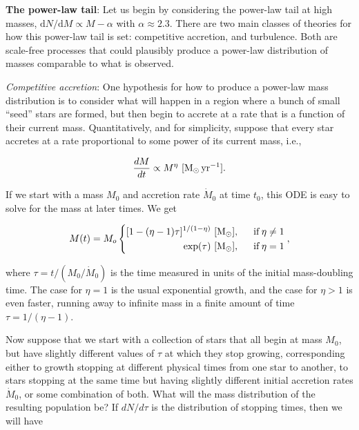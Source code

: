 \documentclass[a4paper,10pt]{article}
\begin{document}
{\noindent}\textbf{The power-law tail}: Let us begin by considering the power-law tail at high masses, $\mathrm{d}N/\mathrm{d}M\propto M-\alpha$ with $\alpha\approx2.3$. There are two main classes of theories for how this power-law tail is set: competitive accretion, and turbulence. Both are scale-free processes that could plausibly produce a power-law distribution of masses comparable to what is observed.

{\noindent}\textit{Competitive accretion}: One hypothesis for how to produce a power-law mass distribution is to consider what will happen in a region where a bunch of small ``seed'' stars are formed, but then begin to accrete at a rate that is a function of their current mass. Quantitatively, and for simplicity, suppose that every star accretes at a rate proportional to some power of its current mass, i.e.,

\begin{align*}
    \frac{dM}{dt} \propto M^\eta ~ [{\rm M_\odot\,yr^{-1}}].
\end{align*}

{\noindent}If we start with a mass $M_0$ and accretion rate $\dot{M}_0$ at time $t_0$, this ODE is easy to solve for the mass at later times. We get

\begin{equation*}
M(t) = M_o
\left\{
\begin{aligned}
[1-(\eta-1)\tau]^{1/(1-\eta)} ~ [{\rm M_\odot}], ~~~~~& \mathrm{if}\,\eta\neq1 \\
\exp(\tau) ~ [{\rm M_\odot}], ~~~~~& \mathrm{if}\,\eta=1
\end{aligned}
\right.
,
\end{equation*}

{\noindent}where $\tau=t/(M_0/\dot{M}_0)$ is the time measured in units of the initial mass-doubling time. The case for $\eta=1$ is the usual exponential growth, and the case for $\eta>1$ is even faster, running away to infinite mass in a finite amount of time $\tau=1/(\eta-1)$.

{\noindent}Now suppose that we start with a collection of stars that all begin at mass $M_0$, but have slightly different values of $\tau$ at which they stop growing, corresponding either to growth stopping at different physical times from one star to another, to stars stopping at the same time but having slightly different initial accretion rates $\dot{M}_0$, or some combination of both. What will the mass distribution of the resulting population be? If $dN/d\tau$ is the distribution of stopping times, then we will have
\end{document}
